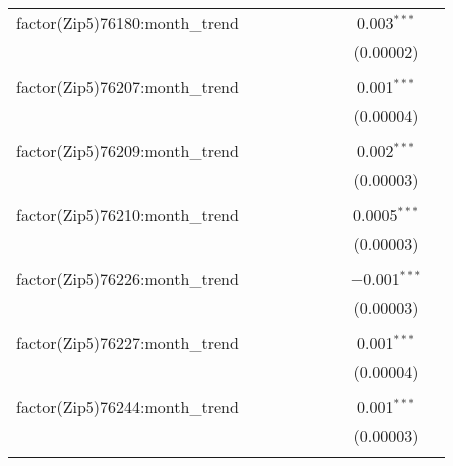 \begin{table}[H]
{\begin{tabular}{@{\extracolsep{5pt}}lcccccccc}
  factor(Zip5)76180:month\_trend &  &  &  &  &  &  & 0.003$^{***}$ &  \\  

   &  &  &  &  &  &  & (0.00002) &  \\  

   & & & & & & & & \\  

  factor(Zip5)76207:month\_trend &  &  &  &  &  &  & 0.001$^{***}$ &  \\  

   &  &  &  &  &  &  & (0.00004) &  \\  

   & & & & & & & & \\  

  factor(Zip5)76209:month\_trend &  &  &  &  &  &  & 0.002$^{***}$ &  \\  

   &  &  &  &  &  &  & (0.00003) &  \\  

   & & & & & & & & \\  

  factor(Zip5)76210:month\_trend &  &  &  &  &  &  & 0.0005$^{***}$ &  \\  

   &  &  &  &  &  &  & (0.00003) &  \\  

   & & & & & & & & \\  

  factor(Zip5)76226:month\_trend &  &  &  &  &  &  & $-$0.001$^{***}$ &  \\  

   &  &  &  &  &  &  & (0.00003) &  \\  

   & & & & & & & & \\  

  factor(Zip5)76227:month\_trend &  &  &  &  &  &  & 0.001$^{***}$ &  \\  

   &  &  &  &  &  &  & (0.00004) &  \\  

   & & & & & & & & \\  

  factor(Zip5)76244:month\_trend &  &  &  &  &  &  & 0.001$^{***}$ &  \\  

   &  &  &  &  &  &  & (0.00003) &  \\  

   & & & & & & & & \\  


\end{tabular}}
\end{table}
